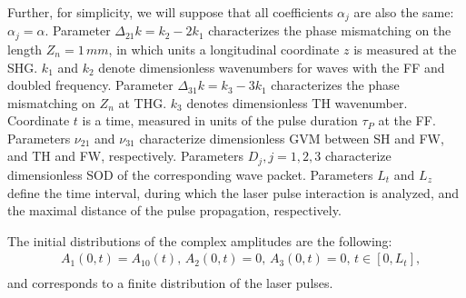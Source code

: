 \documentclass[a4paper, 12pt, onecolumn]{extarticle}
\begin{document}
Further, for simplicity, we will suppose that all coefficients \(\alpha_j\) are also the same: \(\alpha_j=\alpha\). Parameter \(\Delta_{21} k=k_2 - 2k_1\)  characterizes the phase mismatching on the length $Z_n=1\,mm$, in which units a longitudinal coordinate $z$ is measured at the SHG. \(k_1\) and \(k_2\) denote dimensionless wavenumbers for waves with the FF and doubled frequency. Parameter \(\Delta_{31} k=k_3 - 3k_1\) characterizes the phase mismatching on $Z_n$ at THG. \(k_3\) denotes dimensionless TH wavenumber. Coordinate \(t\) is a time, measured in units of the pulse duration \(\tau_P\) at the FF. Parameters \(\nu_{21}\) and \(\nu_{31}\) characterize dimensionless GVM between SH and FW, and TH and FW, respectively. Parameters \(D_{j}, j=1,2,3\) characterize dimensionless SOD of the corresponding wave packet. Parameters \(L_t\) and \(L_z\) define the time interval, during which the laser pulse interaction is analyzed, and the maximal distance of the pulse propagation, respectively.

The initial distributions of the complex amplitudes are the following:
\begin{equation}\begin{aligned}
\label{eq:first}
&A_1(0,t)=A_{10}(t),\, A_2(0,t)=0,\,A_3(0,t)=0,\, t\in[0,L_t],\\
\end{aligned}\end{equation}
and corresponds to a finite distribution of the laser pulses.
\end{document}
